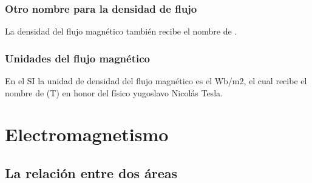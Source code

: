\documentclass[14pt]{beamer}
\begin{document}
\begin{frame}
\frametitle{Otro nombre para la densidad de flujo}
La densidad del flujo magnético también recibe el nombre de .
\end{frame}
\begin{frame}
\frametitle{Unidades del flujo magnético}
En el SI la unidad de densidad del flujo magnético es el Wb/m2, el cual recibe el nombre de  (\unit{\tesla}) en honor del físico yugoslavo Nicolás Tesla.
\end{frame}

\section{Electromagnetismo}
\subsection{La relación entre dos áreas}
\end{document}
